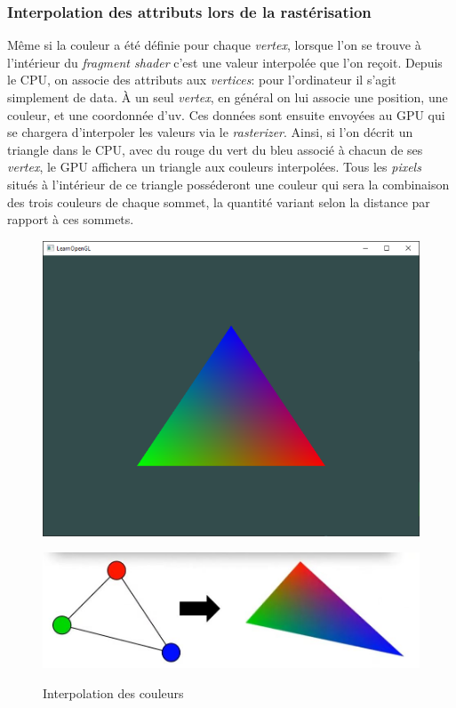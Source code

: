 \subsubsection*{Interpolation des attributs lors de la rastérisation}

Même si la couleur a été définie pour chaque \textit{vertex}, lorsque l'on se trouve à l'intérieur du \textit{fragment shader} c'est une valeur interpolée que l'on reçoit. Depuis le CPU, on associe des attributs aux \textit{vertices}: pour l'ordinateur il s'agit simplement de data. À un seul \textit{vertex}, en général on lui associe une position, une couleur, et une coordonnée d'uv. Ces données sont ensuite envoyées au GPU qui se chargera d'interpoler les valeurs via le \textit{rasterizer}. Ainsi, si l'on décrit un triangle dans le CPU, avec du rouge du vert du bleu associé à chacun de ses \textit{vertex}, le GPU affichera un triangle aux couleurs interpolées. Tous les \textit{pixels} situés à l'intérieur de ce triangle posséderont une couleur qui sera la combinaison des trois couleurs de chaque sommet, la quantité variant selon la distance par rapport à ces sommets.

\begin{figure}[h]
  \begin{minipage}[b]{0.40\linewidth}
    \centering
    \includegraphics[width=\linewidth]{images/shaders/interpolation00.png}
    \label{interpolation00}
  \end{minipage}
  \hspace{0.1\linewidth} %
  \begin{minipage}[b]{0.40\linewidth}
    \centering
    \includegraphics[width=\linewidth]{images/shaders/interpolation01.JPG}
    \label{interpolation01}
  \end{minipage}
  \caption{Interpolation des couleurs}
\end{figure}



